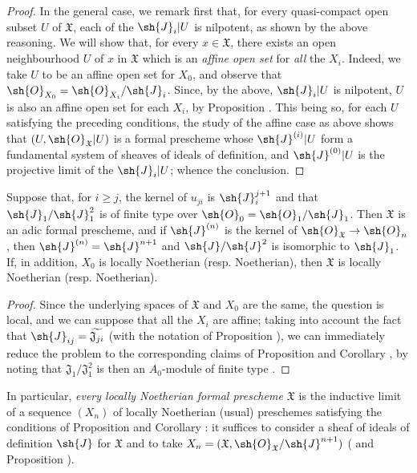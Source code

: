 \begin{proof}
In the general case, we remark first that, for every quasi-compact open subset $U$ of $\mathfrak{X}$, each of the $\sh{J}_i|U$ is nilpotent, as shown by the above reasoning.
We will show that, for every $x\in\mathfrak{X}$, there exists an open neighbourhood $U$ of $x$ in $\mathfrak{X}$ which is an \emph{affine open set} for \emph{all} the $X_i$.
Indeed, we take $U$ to be an affine open set for $X_0$, and observe that $\sh{O}_{X_0}=\sh{O}_{X_i}/\sh{J}_i$.
Since, by the above, $\sh{J}_i|U$ is nilpotent, $U$ is also an affine open set for each $X_i$, by Proposition .
This being so, for each $U$ satisfying the preceding conditions, the study of the affine case as above shows that $(U,\sh{O}_\mathfrak{X}|U)$ is a formal prescheme whose $\sh{J}^{(i)}|U$ form a fundamental system of sheaves of ideals of definition, and $\sh{J}^{(0)}|U$ is the projective limit of the $\sh{J}_i|U$; whence the conclusion.
\end{proof}

\begin{corollary}[10.6.4]
\label{I.10.6.4}
Suppose that, for $i\geq j$, the kernel of $u_{ji}$ is $\sh{J}_i^{j+1}$ and that $\sh{J}_1/\sh{J}_1^2$
is of finite type over $\sh{O}_0=\sh{O}_1/\sh{J}_1$.
Then $\mathfrak{X}$ is an adic formal prescheme, and if $\sh{J}^{(n)}$ is the kernel of $\sh{O}_\mathfrak{X}\to\sh{O}_n$, then $\sh{J}^{(n)}=\sh{J}^{n+1}$ and $\sh{J}/\sh{J}^2$ is isomorphic to $\sh{J}_1$.
If, in addition, $X_0$ is locally Noetherian (resp. Noetherian), then $\mathfrak{X}$ is locally Noetherian (resp. Noetherian).
\end{corollary}

\begin{proof}
Since the underlying spaces of $\mathfrak{X}$ and $X_0$ are the same, the question is local, and we can suppose that all the $X_i$ are affine; taking into account the fact that $\sh{J}_{ij}=\widetilde{\mathfrak{J}_{ji}}$ (with the notation of Proposition ), we can immediately reduce the problem to the corresponding claims of Proposition  and Corollary , by noting that $\mathfrak{J}_1/\mathfrak{J}_1^2$ is then an $A_0$-module of finite type .
\end{proof}

In particular, \emph{every locally Noetherian formal prescheme $\mathfrak{X}$} is the inductive limit of a sequence $(X_n)$ of locally Noetherian (usual) preschemes satisfying the conditions of Proposition  and Corollary : it suffices to consider a sheaf of ideals of definition $\sh{J}$ for $\mathfrak{X}$  and to take $X_n=(\mathfrak{X},\sh{O}_\mathfrak{X}/\sh{J}^{n+1})$ ( and Proposition ).

